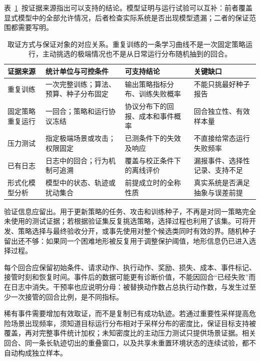 表~\ref{tab:rl-trustworthy-evidence-sources}~按证据来源指出可以支持的结论。模型证明与运行试验可以互补：前者覆盖显式模型中的全部允许情况，后者检查实际系统是否出现模型遗漏；二者的保证范围都需要写明。

\begin{table}[t]
  \centering
  \begin{tabularx}{\linewidth}{@{}>{\raggedright\arraybackslash}p{23mm}XXX@{}}
    \toprule
    证据来源 & 统计单位与可控条件 & 可支持结论 & 关键缺口 \\
    \midrule
    重复训练 & 一次完整训练；算法、预算、种子分布固定 & 输出策略指标分布、训练失败概率 & 不能只挑最好种子报告 \\
    固定策略重复运行 & 一回合；策略和运行协议冻结 & 协议分布下的回报、成本和事件概率 & 回合独立性、有效样本量 \\
    压力测试 & 指定极端场景或攻击；权限固定 & 已测条件下的失效及响应 & 不直接给常态运行失败频率 \\
    已有日志 & 日志中的回合；行为机制可追溯 & 覆盖与校正条件下的离线评价 & 漏报事件、选择性记录、支持不足 \\
    形式化模型分析 & 模型中的状态、轨迹或扰动集合 & 前提成立时的全称性质 & 真实系统是否满足抽象与误差前提 \\
    \bottomrule
  \end{tabularx}
  \caption{取证方式与保证对象的对应关系。重复训练的一条学习曲线不是一次固定策略运行，主动挑选的极端情况也不是从日常运行分布随机抽到的回合。}
  \label{tab:rl-trustworthy-evidence-sources}
\end{table}

验证信息应留出。用于更新策略的任务、攻击和训练种子，不再是对同一策略完全未使用的测试证据；若根据验证集反复挑选策略，选择过程也利用了该集。可将开发、策略选择与最终验收分开，或事先使用对整个候选类同时有效的界。随机种子留出还不够：如果同一个困难地形被反复用于调整保护阈值，地形信息仍已进入选择过程。

每个回合应保留初始条件、请求动作、执行动作、奖励、损失、成本、事件标记、接管时刻和恢复时间。事件后的数据可能更有诊断价值，不能因回合“已经失败”而在日志中消失。干预率也应说明分母：被替换动作数占总执行动作数，与发生过至少一次接管的回合比例，是不同指标。

稀有事件需要增加有效取证，而不是复制已有成功轨迹。若通过重要性采样提高危险场景出现频率，须知道目标运行分布相对于采样分布的密度比，保证目标支持被覆盖，再对完整事件统计加权；未知密度比的主动压力测试只提供场景证据。相关回合、同一条长轨迹切出的重叠窗口，以及共享未重置环境状态的连续试验，都不自动构成独立样本。

